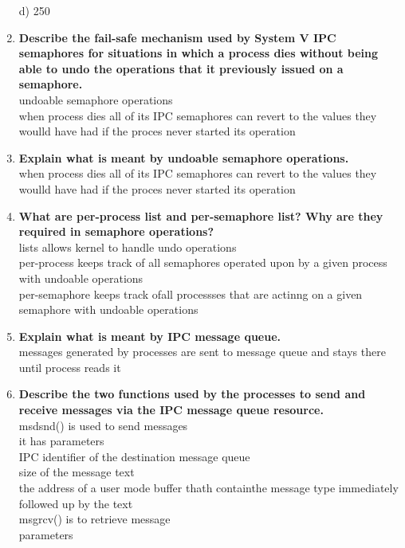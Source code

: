 \documentclass[a4paper,12pt]{article}
\begin{document}
\begin{flushleft}
\begin{enumerate}
{\color{red}
d) 250 }\\
\item \textbf{ Describe the fail-safe mechanism used by System V IPC semaphores for situations in which a process dies without being able to undo the operations that it previously issued on a semaphore.}\\
{\color{red}undoable semaphore operations\\
when process dies all of its IPC semaphores can revert to the values they woulld have had if the proces never started its operation
}\\
\item \textbf{ Explain what is meant by undoable semaphore operations.}\\
{\color{red}when process dies all of its IPC semaphores can revert to the values they woulld have had if the proces never started its operation}\\
\item \textbf{ What are per-process list and per-semaphore list? Why are they required in semaphore operations?}\\
{\color{red}lists allows kernel to handle undo operations\\
per-process keeps track of all semaphores operated upon by a given process with undoable operations\\
per-semaphore keeps track ofall processses that are actinng on a given semaphore with undoable operations}\\
\item \textbf{ Explain what is meant by IPC message queue.}\\
{\color{red}messages generated by processes are sent to message queue and stays
there until process reads it}\\
\item \textbf{ Describe the two functions used by the processes to send and receive messages via the IPC message queue resource.}\\
{\color{red}msdsnd() is used to send messages\\
it has parameters\\
IPC identifier of the destination message queue\\
size of the message text\\
the address of a user mode buffer thath containthe message type immediately followed up by the text\\
msgrcv() is to retrieve message\\
parameters\\
}
\end{enumerate}
\end{flushleft}
\end{document}
